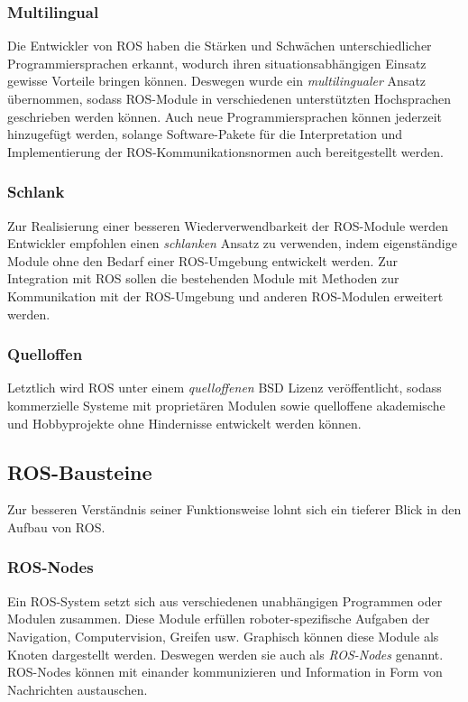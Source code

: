\subsubsection{Multilingual}
	Die Entwickler von ROS haben die Stärken und Schwächen unterschiedlicher Programmiersprachen erkannt, wodurch ihren situationsabhängigen Einsatz gewisse Vorteile bringen können. Deswegen wurde ein \emph{multilingualer} Ansatz übernommen, sodass ROS-Module in verschiedenen unterstützten Hochsprachen geschrieben werden können. Auch neue Programmiersprachen können jederzeit hinzugefügt werden, solange Software-Pakete für die Interpretation und Implementierung der ROS-Kommunikationsnormen auch bereitgestellt werden. \autocite[3]{QuigleyROS2015} 
\subsubsection{Schlank}
	Zur Realisierung einer besseren Wiederverwendbarkeit der ROS-Module werden Entwickler empfohlen einen \emph{schlanken} Ansatz zu verwenden, indem eigenständige Module ohne den Bedarf einer ROS-Umgebung entwickelt werden. Zur Integration mit ROS sollen die bestehenden Module mit Methoden zur Kommunikation mit der ROS-Umgebung und anderen ROS-Modulen erweitert werden. \autocite[3]{QuigleyROS2015} 
\subsubsection{Quelloffen}
	Letztlich wird ROS unter einem \emph{quelloffenen} BSD Lizenz veröffentlicht, sodass kommerzielle Systeme mit proprietären Modulen sowie quelloffene akademische und Hobbyprojekte ohne Hindernisse entwickelt werden können. \autocite[4]{QuigleyROS2015}
	
\subsection{ROS-Bausteine}
Zur besseren Verständnis seiner Funktionsweise lohnt sich ein tieferer Blick in den Aufbau von ROS.

\subsubsection{ROS-Nodes}
Ein ROS-System setzt sich aus verschiedenen unabhängigen Programmen oder Modulen zusammen. Diese Module erfüllen roboter-spezifische Aufgaben der Navigation, Computervision, Greifen usw. Graphisch können diese Module als Knoten dargestellt werden. Deswegen werden sie auch als \emph{ROS-Nodes} genannt. ROS-Nodes können mit einander kommunizieren und Information in Form von Nachrichten austauschen. \autocite[9-10]{QuigleyROS2015} 

